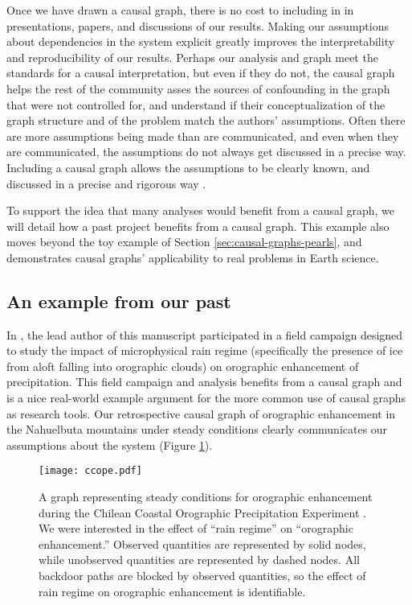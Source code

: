 \documentclass[12pt]{article}
\begin{document}
Once we have drawn a causal graph, there is no cost to including in in
presentations, papers, and discussions of our results. Making our
assumptions about dependencies in the system explicit greatly improves
the interpretability and reproducibility of our results. Perhaps our
analysis and graph meet the standards for a causal interpretation, but
even if they do not, the causal graph helps the rest of the community
asses the sources of confounding in the graph that were not controlled
for, and understand if their conceptualization of the graph structure
and of the problem match the authors' assumptions. Often there are
more assumptions being made than are communicated, and even when they
are communicated, the assumptions do not always get discussed in a
precise way. Including a causal graph allows the assumptions to be
clearly known, and discussed in a precise and rigorous way
\citep{hannart-da}.

To support the idea that many analyses would benefit from a causal
graph, we will detail how a past project benefits from a causal
graph. This example also moves beyond the toy example of Section
\ref{sec:causal-graphs-pearls}, and demonstrates causal graphs'
applicability to real problems in Earth science.

\subsection{An example from our past}

In \citet{massmann2017}, the lead author of this manuscript
participated in a field campaign designed to study the impact of
microphysical rain regime (specifically the presence of ice from aloft
falling into orographic clouds) on orographic enhancement of
precipitation. This field campaign and analysis benefits from a causal
graph and is a nice real-world example argument for the more common
use of causal graphs as research tools. Our retrospective causal graph
of orographic enhancement in the Nahuelbuta mountains under steady
conditions clearly communicates our assumptions about the system
(Figure \ref{fig:ccope}).

\begin{figure} \texttt{[image: ccope.pdf]}
  \caption{A graph representing steady conditions for orographic
    enhancement during the Chilean Coastal Orographic Precipitation
    Experiment \citep[CCOPE,][]{massmann2017}. We were interested in the
    effect of ``rain regime'' on ``orographic enhancement.''  Observed
    quantities are represented by solid nodes, while unobserved quantities
    are represented by dashed nodes. All backdoor paths are blocked by
    observed quantities, so the effect of rain regime on orographic
    enhancement is identifiable.}
  \label{fig:ccope}
\end{figure}
\end{document}
